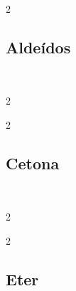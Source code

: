 \documentclass[\mainfilename]{subfiles}
\begin{document}
\begin{exampleBox}
\begin{multicols}{2}
        \begin{exampleBox}2{}\centering
            \\
        \end{exampleBox}
        
    \end{multicols}
        
    \subsection*{Aldeídos}\\
    \vspace{-4ex}
    \begin{multicols}{2}
    
        \begin{exampleBox}2{}\centering
            \\
        \end{exampleBox}
    
        \begin{exampleBox}2{}\centering
            \\
        \end{exampleBox}
    
    \end{multicols}
        
    \subsection*{Cetona}\\
    \vspace{-4ex}
    \begin{multicols}{2}
    
        \begin{exampleBox}2{}\centering
            \\
        \end{exampleBox}
    
        \begin{exampleBox}2{}\centering
            \\
        \end{exampleBox}
    
    \end{multicols}
    
    \subsection*{Eter}\\
    \vspace{-4ex}
    \begin{multicols}{2}
    

\end{multicols}
\end{exampleBox}
\end{document}
